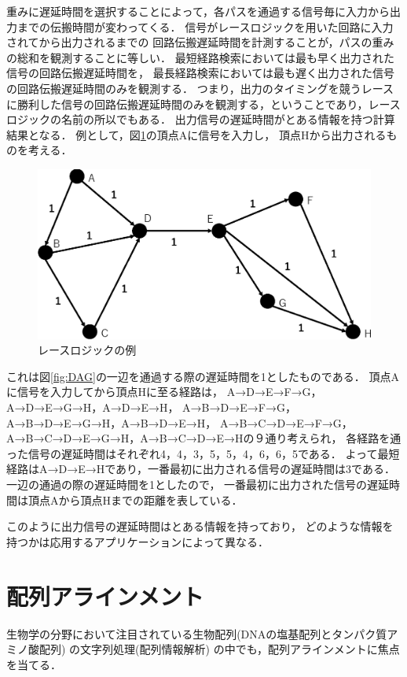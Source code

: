 重みに遅延時間を選択することによって，各パスを通過する信号毎に入力から出力までの伝搬時間が変わってくる．
信号がレースロジックを用いた回路に入力されてから出力されるまでの
回路伝搬遅延時間を計測することが，パスの重みの総和を観測することに等しい．
最短経路検索においては最も早く出力された信号の回路伝搬遅延時間を，
最長経路検索においては最も遅く出力された信号の回路伝搬遅延時間のみを観測する．
つまり，出力のタイミングを競うレースに勝利した信号の回路伝搬遅延時間のみを観測する，ということであり，レースロジックの名前の所以でもある．
出力信号の遅延時間がとある情報を持つ計算結果となる．
例として，図\ref{fig:DAG1}の頂点Aに信号を入力し，
頂点Hから出力されるものを考える．
\begin{figure}[t!]
\begin{center}
\includegraphics[keepaspectratio,scale=0.5]{fig/2/DAG1.eps}
\caption{レースロジックの例}
\label{fig:DAG1}
\end{center}
\end{figure}
これは図\ref{fig:DAG}の一辺を通過する際の遅延時間を1としたものである．
頂点Aに信号を入力してから頂点Hに至る経路は，
A→D→E→F→G，A→D→E→G→H，A→D→E→H，
A→B→D→E→F→G，A→B→D→E→G→H，A→B→D→E→H，
A→B→C→D→E→F→G，A→B→C→D→E→G→H，A→B→C→D→E→Hの９通り考えられ，
各経路を通った信号の遅延時間はそれぞれ4，4，3，5，5，4，6，6，5である．
よって最短経路はA→D→E→Hであり，一番最初に出力される信号の遅延時間は3である．
一辺の通過の際の遅延時間を1としたので，
一番最初に出力された信号の遅延時間は頂点Aから頂点Hまでの距離を表している．

このように出力信号の遅延時間はとある情報を持っており，
どのような情報を持つかは応用するアプリケーションによって異なる．

\section{配列アラインメント}
生物学の分野において注目されている生物配列(DNAの塩基配列とタンパク質アミノ酸配列) の文字列処理(配列情報解析)
\cite{浅井潔2000配列情報と確立モデル,後藤修1998マルチプルアラインメントは生体高分子情報の交差点}
の中でも，配列アラインメントに焦点を当てる．

